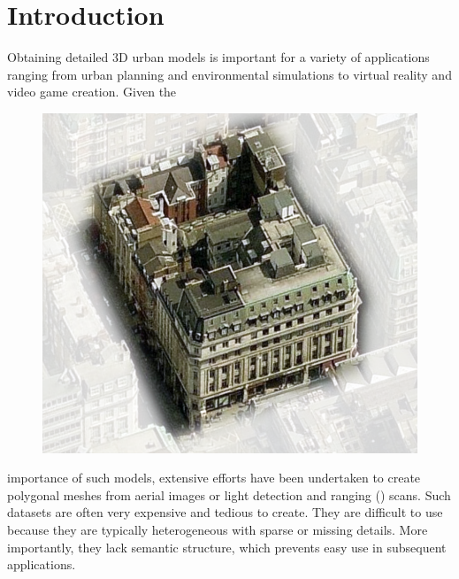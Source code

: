 \section{Introduction}
\label{sec:intro}


Obtaining detailed 3D urban models is important for a variety of applications ranging from urban planning and environmental simulations to virtual reality and video game creation. Given the
\begin{figure}
\vspace*{-3ex} %
\hspace*{-0.06\columnwidth}  %
  \includegraphics[width=0.56\columnwidth]{../images/teaser/inset.png}
\end{figure}
importance of such models, extensive efforts have been undertaken to create polygonal meshes from aerial images or light detection and ranging (\lidar) scans. Such  datasets are often very  expensive  and tedious to create.
They are difficult to use because they are typically heterogeneous with sparse or missing details. More importantly, they lack semantic structure, which prevents easy use in subsequent applications. 


